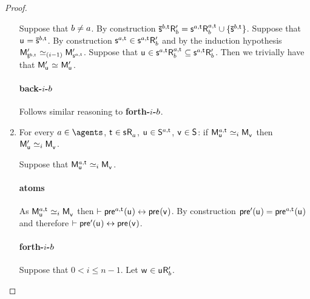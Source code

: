 \begin{proof}
\begin{enumerate}
        Suppose that $b \neq a$.
        By construction $\aPStateS[\agentB,\aStateT] \aAccessibilityP{\agentB} = \aStateS[\agentA,\aStateT] \aAccessibility[\agentA,\aStateT]{\agentB} \cup \{\aPStateS[\agentB,\aStateT]\}$. 
        Suppose that $\aStateU = \aPStateS[\agentB,\aStateT]$.
        By construction $\aStateS[\agentA,\aStateT] \in \aStateS[\agentA,\aStateT] \aAccessibilityP{\agentB}$ and by the induction hypothesis $\aPModelP{\aPStateS[\agentB,\aStateT]} \bisimilar[(i - 1)] \aPModelP{\aStateS[\agentA,\aStateT]}$.
        Suppose that $\aStateU \in \aStateS[\agentA,\aStateT] \aAccessibility[\agentA,\aStateT]{\agentB} \subseteq \aStateS[\agentA,\aStateT] \aAccessibilityP{\agentB}$.
        Then we trivially have that $\aPModelP{\aStateU} \bisimilar \aPModelP{\aStateU}$.

        \paragraph{back-$i$-$b$} Follows similar reasoning to {\bf forth-$i$-$b$}.

    \item 
        For every $\agentA \in \agents$, $\aStateT \in \aStateS \aAccessibility{\agentA}$, $\aStateU \in \aStates[\agentA,\aStateT]$, $\aStateV \in \aStates$: if $\aPModel[\agentA,\aStateT]{\aStateU} \bisimilar[i] \aPModel{\aStateV}$ then $\aPModelP{\aStateU} \bisimilar[i] \aPModel{\aStateV}$.

        Suppose that $\aPModel[\agentA,\aStateT]{\aStateU} \bisimilar[i] \aPModel{\aStateV}$. 

        \paragraph{atoms}

        As $\aPModel[\agentA,\aStateT]{\aStateU} \bisimilar[i] \aPModel{\aStateV}$ then $\proves \aPrecondition[\agentA,\aStateT](\aStateU) \iff \aPrecondition(\aStateV)$. 
        By construction $\aPreconditionP(\aStateU) = \aPrecondition[\agentA,\aStateT](\aStateU)$ and therefore $\proves \aPreconditionP(\aStateU) \iff \aPrecondition(\aStateV)$.

        \paragraph{forth-$i$-$b$}

        Suppose that $0 < i \leq n - 1$.
        Let $\aStateW \in \aStateU \aAccessibilityP{\agentB}$.


\end{enumerate}
\end{proof}
